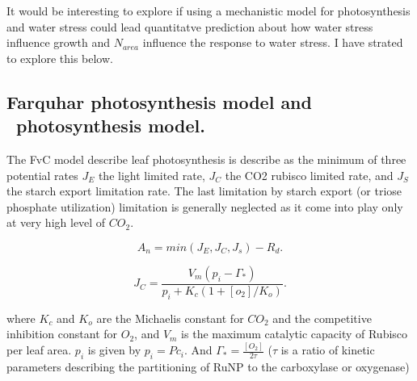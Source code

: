 \documentclass[a4paper,11pt]{article}
\begin{document}
It would be interesting to explore if using a mechanistic model for photosynthesis and water stress could lead quantitatve prediction about how water stress influence growth and $N_{area}$ influence the response to water stress. I have strated to explore this below.


\subsection{Farquhar photosynthesis model and \plant\ photosynthesis model.}

The FvC model describe leaf photosynthesis is describe as the minimum
of three potential rates $J_E$ the light limited rate, $J_C$ the CO2
rubisco limited rate, and $J_S$ the starch export limitation rate. The
last limitation by starch export (or triose phosphate utilization)
limitation is generally neglected as it come into play only at very
high level of $CO_2$. 

\begin{equation}
\label{eq:An}
A_n= min(J_E, J_C, J_s) - R_d.
\end{equation}






\begin{equation}
\label{eq:JC}
J_C= \frac{V_m (p_i - \Gamma_*)}{p_i + K_c (1+[o_2]/K_o)}.
\end{equation}

where $K_c$ and $K_o$ are the Michaelis constant for $CO_2$ and the competitive inhibition constant for $O_2$, and $V_m$ is the maximum catalytic capacity of Rubisco per leaf area.
$p_i$ is given by $p_i = P c_i$. And $\Gamma_* = \frac{[O_2]}{2\tau}$ ($\tau$ is a ratio of kinetic parameters describing the partitioning of RuNP to the carboxylase or oxygenase)
\end{document}
